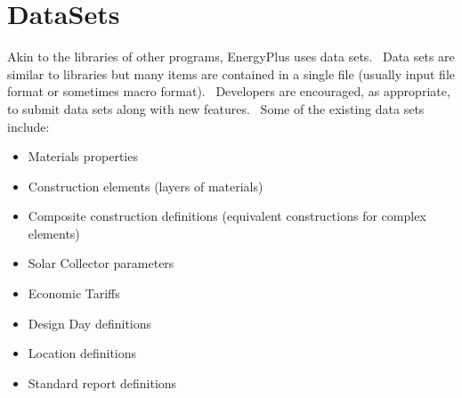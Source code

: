 \section{DataSets}\label{datasets}

Akin to the libraries of other programs, EnergyPlus uses data sets.~ Data sets are similar to libraries but many items are contained in a single file (usually input file format or sometimes macro format).~ Developers are encouraged, as appropriate, to submit data sets along with new features.~ Some of the existing data sets include:

\begin{itemize}
\item
  Materials properties
\item
  Construction elements (layers of materials)
\item
  Composite construction definitions (equivalent constructions for complex elements)
\item
  Solar Collector parameters
\item
  Economic Tariffs
\item
  Design Day definitions
\item
  Location definitions
\item
  Standard report definitions
\end{itemize}
